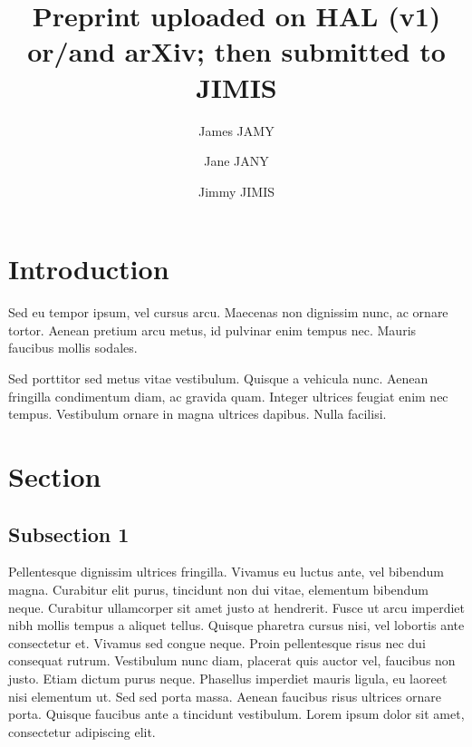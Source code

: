 \documentclass{jimis}
\title{Preprint uploaded on HAL (v1) or/and arXiv; then submitted to JIMIS}
\author[1]{James JAMY}
\author[2]{Jane JANY}
\author[*1,2]{Jimmy JIMIS}
\affil[1]{University One, Country A}
\affil[2]{University Two, Country B}
\begin{document}
\maketitle

\linenumbers



\section{Introduction}

\strut
\vspace{-4ex}

Sed eu tempor ipsum, vel cursus arcu. Maecenas non dignissim nunc, ac ornare tortor. Aenean
pretium arcu metus, id pulvinar enim tempus nec. Mauris faucibus mollis sodales. 

Sed porttitor sed metus vitae vestibulum. Quisque a vehicula nunc. Aenean fringilla condimentum
diam, ac gravida quam. Integer ultrices feugiat enim nec tempus. Vestibulum ornare in magna
ultrices dapibus. Nulla facilisi. 

\section{Section}

\subsection{Subsection 1}
Pellentesque dignissim ultrices fringilla. Vivamus eu luctus ante, vel bibendum magna.
Curabitur elit purus, tincidunt non dui vitae, elementum bibendum neque. Curabitur
ullamcorper sit amet justo at hendrerit. Fusce ut arcu imperdiet nibh mollis tempus a aliquet
tellus. Quisque pharetra cursus nisi, vel lobortis ante consectetur et. Vivamus sed congue
neque. Proin pellentesque risus nec dui consequat rutrum. Vestibulum nunc diam, placerat
quis auctor vel, faucibus non justo. Etiam dictum purus neque. Phasellus imperdiet mauris
ligula, eu laoreet nisi elementum ut. Sed sed porta massa. Aenean faucibus risus ultrices
ornare porta. Quisque faucibus ante a tincidunt vestibulum. Lorem ipsum dolor sit amet,
consectetur adipiscing elit.
\end{document}
